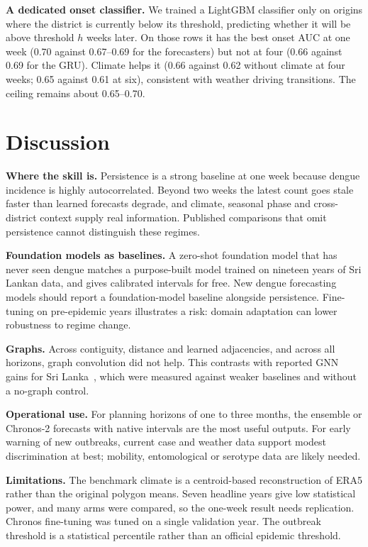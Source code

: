 \textbf{A dedicated onset classifier.} We trained a LightGBM classifier only on origins where the district is currently below its threshold, predicting whether it will be above threshold $h$ weeks later. On those rows it has the best onset AUC at one week (0.70 against 0.67--0.69 for the forecasters) but not at four (0.66 against 0.69 for the GRU). Climate helps it (0.66 against 0.62 without climate at four weeks; 0.65 against 0.61 at six), consistent with weather driving transitions. The ceiling remains about 0.65--0.70.

\section{Discussion}

\textbf{Where the skill is.} Persistence is a strong baseline at one week because dengue incidence is highly autocorrelated. Beyond two weeks the latest count goes stale faster than learned forecasts degrade, and climate, seasonal phase and cross-district context supply real information. Published comparisons that omit persistence cannot distinguish these regimes.

\textbf{Foundation models as baselines.} A zero-shot foundation model that has never seen dengue matches a purpose-built model trained on nineteen years of Sri Lankan data, and gives calibrated intervals for free. New dengue forecasting models should report a foundation-model baseline alongside persistence. Fine-tuning on pre-epidemic years illustrates a risk: domain adaptation can lower robustness to regime change.

\textbf{Graphs.} Across contiguity, distance and learned adjacencies, and across all horizons, graph convolution did not help. This contrasts with reported GNN gains for Sri Lanka~\cite{weng2024graph,gulmohamed2026denguegnn}, which were measured against weaker baselines and without a no-graph control.

\textbf{Operational use.} For planning horizons of one to three months, the ensemble or Chronos-2 forecasts with native intervals are the most useful outputs. For early warning of new outbreaks, current case and weather data support modest discrimination at best; mobility, entomological or serotype data are likely needed.

\textbf{Limitations.} The benchmark climate is a centroid-based reconstruction of ERA5 rather than the original polygon means. Seven headline years give low statistical power, and many arms were compared, so the one-week result needs replication. Chronos fine-tuning was tuned on a single validation year. The outbreak threshold is a statistical percentile rather than an official epidemic threshold.

